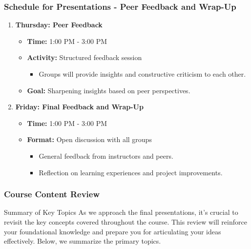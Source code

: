 \documentclass[aspectratio=169]{beamer}
\begin{document}
\begin{frame}[fragile]
    \frametitle{Schedule for Presentations - Peer Feedback and Wrap-Up}
    \begin{enumerate}[resume]
        \item \textbf{Thursday: Peer Feedback}
            \begin{itemize}
                \item \textbf{Time:} 1:00 PM - 3:00 PM
                \item \textbf{Activity:} Structured feedback session
                    \begin{itemize}
                        \item Groups will provide insights and constructive criticism to each other.
                    \end{itemize}
                \item \textbf{Goal:} Sharpening insights based on peer perspectives.
            \end{itemize}

        \item \textbf{Friday: Final Feedback and Wrap-Up}
            \begin{itemize}
                \item \textbf{Time:} 1:00 PM - 3:00 PM
                \item \textbf{Format:} Open discussion with all groups
                    \begin{itemize}
                        \item General feedback from instructors and peers.
                        \item Reflection on learning experiences and project improvements.
                    \end{itemize}
            \end{itemize}
    \end{enumerate}
\end{frame}

\begin{frame}[fragile]
    \frametitle{Course Content Review}
    \begin{block}{Summary of Key Topics}
        As we approach the final presentations, it’s crucial to revisit the key concepts covered throughout the course. This review will reinforce your foundational knowledge and prepare you for articulating your ideas effectively. Below, we summarize the primary topics.
    \end{block}
\end{frame}
\end{document}
